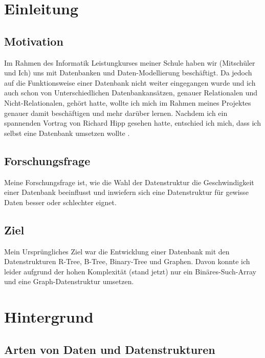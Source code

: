 \documentclass[11pt,a4paper]{article}
\begin{document}
\clearpage

\pagestyle{plain}

\section{Einleitung}

\subsection{Motivation}

Im Rahmen des Informatik Leistungkurses meiner Schule haben wir (Mitschüler und Ich) uns
mit Datenbanken und Daten-Modellierung beschäftigt. Da jedoch auf die Funktionsweise einer
Datenbank nicht weiter eingegangen wurde und ich auch schon von Unterschiedlichen
Datenbankansätzen, genauer Relationalen und Nicht-Relationalen, gehört hatte,
wollte ich mich im Rahmen meines Projektes genauer damit beschäftigen
und mehr darüber lernen.
Nachdem ich ein spannenden Vortrag von Richard Hipp gesehen hatte,
entschied ich mich, dass ich selbst eine Datenbank umsetzen wollte \cite{sql_ideas}.

\subsection{Forschungsfrage}

Meine Forschungsfrage ist, wie die Wahl der Datenstruktur die
Geschwindigkeit einer Datenbank beeinflusst und inwiefern sich eine Datenstruktur
für gewisse Daten besser oder schlechter eignet.

\subsection{Ziel}

Mein Ursprüngliches Ziel war die Entwicklung einer Datenbank
mit den Datenstrukturen R-Tree, B-Tree, Binary-Tree und Graphen.
Davon konnte ich leider aufgrund der hohen Komplexität (stand jetzt) nur ein
Binäres-Such-Array und eine Graph-Datenstruktur umsetzen.

\clearpage

\section{Hintergrund}

\subsection{Arten von Daten und Datenstrukturen}
\end{document}
